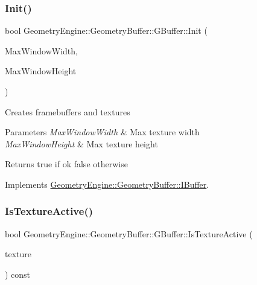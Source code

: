 \subsubsection{\texorpdfstring{Init()}{Init()}}
{\footnotesize\ttfamily bool Geometry\+Engine\+::\+Geometry\+Buffer\+::\+G\+Buffer\+::\+Init (\begin{DoxyParamCaption}\item[{unsigned int}]{Max\+Window\+Width,  }\item[{unsigned int}]{Max\+Window\+Height }\end{DoxyParamCaption})\hspace{0.3cm}{\ttfamily [virtual]}}

Creates framebuffers and textures 
\begin{DoxyParams}{Parameters}
{\em Max\+Window\+Width} & Max texture width \\
\hline
{\em Max\+Window\+Height} & Max texture height \\
\hline
\end{DoxyParams}
\begin{DoxyReturn}{Returns}
true if ok false otherwise 
\end{DoxyReturn}


Implements \mbox{\hyperlink{class_geometry_engine_1_1_geometry_buffer_1_1_i_buffer_ace4f0f514bf5a96790fbfffe515dcc0b}{Geometry\+Engine\+::\+Geometry\+Buffer\+::\+I\+Buffer}}.

\mbox{\label{class_geometry_engine_1_1_geometry_buffer_1_1_g_buffer_a66ccde86e455532b2eac771163570f04}} 
\subsubsection{\texorpdfstring{IsTextureActive()}{IsTextureActive()}}
{\footnotesize\ttfamily bool Geometry\+Engine\+::\+Geometry\+Buffer\+::\+G\+Buffer\+::\+Is\+Texture\+Active (\begin{DoxyParamCaption}\item[{\mbox{\hyperlink{class_geometry_engine_1_1_geometry_buffer_1_1_g_buffer_a718dceafcac1915f7de061108597e1cc}{G\+B\+U\+F\+F\+E\+R\+\_\+\+T\+E\+X\+T\+U\+R\+E\+\_\+\+T\+Y\+PE}}}]{texture }\end{DoxyParamCaption}) const\hspace{0.3cm}{\ttfamily [inline]}}

